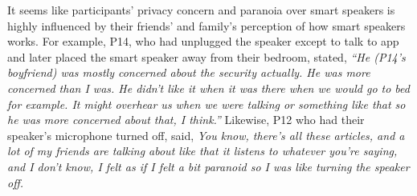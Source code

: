         It seems like participants' privacy concern and paranoia over smart speakers is highly influenced by their friends' and family's perception of how smart speakers works. 
        For example, P14, who had unplugged the speaker except to talk to \acl{app} and later placed the smart speaker away from their bedroom, stated,
                \textit{``He (P14's boyfriend) was mostly concerned about the security actually. He was more concerned than I was. 
                He didn't like it when it was there when we would go to bed for example. 
                It might overhear us when we were talking or something like that so he was more concerned about that, I think.''}
        Likewise, P12 who had their speaker's microphone turned off, said,
                \textit{You know, there's all these articles, and a lot of my friends are talking about like that it listens to whatever you're saying, and I don't know, I felt as if I felt a bit paranoid so I was like turning the speaker off. 
                }



    
